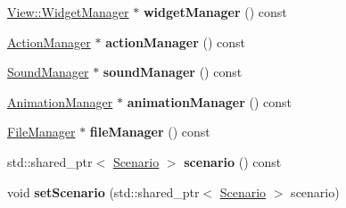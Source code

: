 \begin{Indent}
\begin{DoxyCompactItemize}
\item 
\mbox{\label{classrev_1_1_core_engine_a87fc488125522911044ff3d54984ca1d}} 
\mbox{\hyperlink{classrev_1_1_view_1_1_widget_manager}{View\+::\+Widget\+Manager}} $\ast$ {\bfseries widget\+Manager} () const
\item 
\mbox{\label{classrev_1_1_core_engine_aebda2230db4f0085701ad463c99a965d}} 
\mbox{\hyperlink{classrev_1_1_action_manager}{Action\+Manager}} $\ast$ {\bfseries action\+Manager} () const
\item 
\mbox{\label{classrev_1_1_core_engine_adc8b41c5c163ac43450d15a9ed856214}} 
\mbox{\hyperlink{classrev_1_1_sound_manager}{Sound\+Manager}} $\ast$ {\bfseries sound\+Manager} () const
\item 
\mbox{\label{classrev_1_1_core_engine_adce6bf658d1c5dfc15ffabe513c6ea49}} 
\mbox{\hyperlink{classrev_1_1_animation_manager}{Animation\+Manager}} $\ast$ {\bfseries animation\+Manager} () const
\item 
\mbox{\label{classrev_1_1_core_engine_aef9645b0d33ed21de46e8afa94338994}} 
\mbox{\hyperlink{classrev_1_1_file_manager}{File\+Manager}} $\ast$ {\bfseries file\+Manager} () const
\item 
\mbox{\label{classrev_1_1_core_engine_aa7255beebe53ff902335ad0b912b1c95}} 
std\+::shared\+\_\+ptr$<$ \mbox{\hyperlink{classrev_1_1_scenario}{Scenario}} $>$ {\bfseries scenario} () const
\item 
\mbox{\label{classrev_1_1_core_engine_ab2edcdfbc83b70471b1cf20e5a41b656}} 
void {\bfseries set\+Scenario} (std\+::shared\+\_\+ptr$<$ \mbox{\hyperlink{classrev_1_1_scenario}{Scenario}} $>$ scenario)
\end{DoxyCompactItemize}
\end{Indent}
